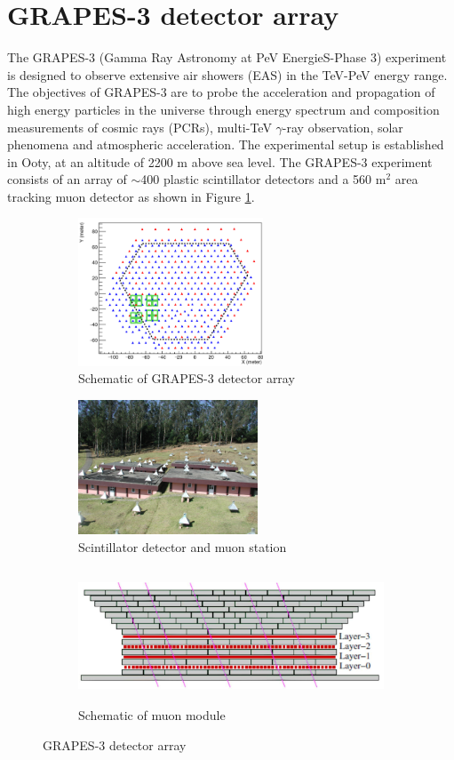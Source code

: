 \documentclass[12pt]{article}
\begin{document}
\section{GRAPES-3 detector array}
The GRAPES-3 (Gamma Ray Astronomy at PeV EnergieS-Phase 3) experiment is designed to observe extensive air showers (EAS) in the TeV-PeV energy range\cite{gupta}. The objectives of GRAPES-3 are to probe the acceleration and propagation of high energy particles in the universe through energy spectrum and composition measurements of cosmic rays (PCRs), multi-TeV $\gamma$-ray observation, solar phenomena and atmospheric acceleration. The experimental setup is established in Ooty, at an altitude of 2200 m above sea level. The GRAPES-3 experiment \cite{anuj}\cite{gupta} consists of an array of $\sim$400 plastic scintillator detectors  and a 560 m$^2$ area tracking muon detector as shown in Figure \ref{fig:array-map}. 

\begin{figure}[h]
\begin{subfigure}{0.32\textwidth}
\includegraphics[width=0.9\linewidth, height=4.4cm]{array-map} 
\caption{Schematic of GRAPES-3 detector array}
\label{fig:array-map}
\end{subfigure}
\begin{subfigure}{0.32\textwidth}
\includegraphics[width=0.9\linewidth, height=4cm]{detector} 
\caption{Scintillator detector and muon station}
\label{fig:detector}
\end{subfigure}
\begin{subfigure}{0.32\textwidth}
\includegraphics[width=0.9\linewidth, height=4cm]{mu-station} 
\caption{Schematic of muon module}
\label{fig:mu-station}
\end{subfigure}
\caption{GRAPES-3 detector array}
\label{fig:g3array}
\end{figure}
 
\end{document}
